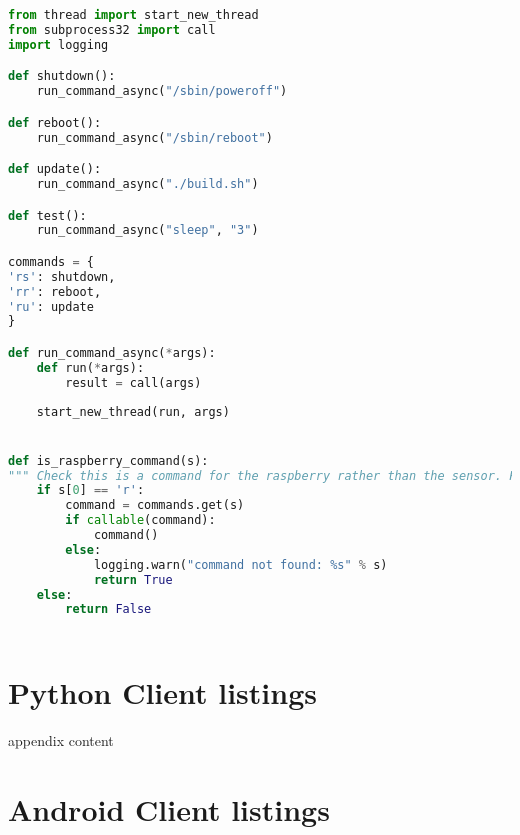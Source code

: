 \documentclass[hidelinks,11pt,a4paper,oneside,article]{memoir}
\begin{document}
\begin{lstlisting}[label={listing:rpi-subprocess},caption={Subprocess example},language=Python, style=styleprogrammingappendix]
from thread import start_new_thread
from subprocess32 import call
import logging

def shutdown():
    run_command_async("/sbin/poweroff")

def reboot():
    run_command_async("/sbin/reboot")

def update():
    run_command_async("./build.sh")

def test():
    run_command_async("sleep", "3")

commands = {
'rs': shutdown,
'rr': reboot,
'ru': update
}

def run_command_async(*args):
    def run(*args):
        result = call(args)
    
    start_new_thread(run, args)


def is_raspberry_command(s):
""" Check this is a command for the raspberry rather than the sensor. First letter must be an 'r'"""
    if s[0] == 'r':
        command = commands.get(s)
        if callable(command):
            command()
        else:
            logging.warn("command not found: %s" % s)
            return True
    else:
        return False



\end{lstlisting}\vspace{14pt}

\clearpage
{}

\chapter{Python Client listings}\label{appx:pythonclient}
appendix content
\clearpage
{}

\chapter{Android Client listings}\label{appx:androidclient}
\end{document}
